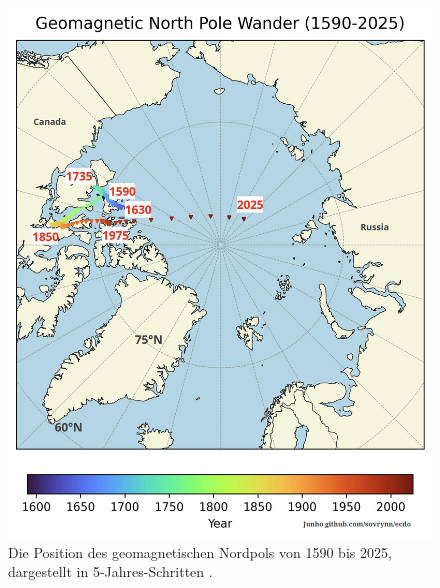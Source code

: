 \documentclass[10pt,twocolumn,letterpaper]{article}
\begin{document}
\begin{figure}[t]
\begin{center}
   \includegraphics[width=1\linewidth]{npw.jpg}
\end{center}
   \caption{Die Position des geomagnetischen Nordpols von 1590 bis 2025, dargestellt in 5-Jahres-Schritten \cite{142}.}
\label{fig:13}
\label{fig:onecol}
\end{figure}
\end{document}
